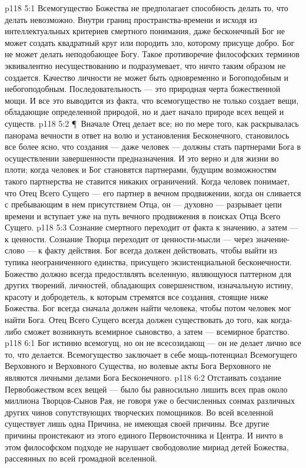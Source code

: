 \vs p118 5:1 Всемогущество Божества не предполагает способность делать то, что делать невозможно. Внутри границ пространства\hyp{}времени и исходя из интеллектуальных критериев смертного понимания, даже бесконечный Бог не может создать квадратный круг или породить зло, которому присуще добро. Бог не может делать неподобающее Богу. Такое противоречие философских терминов эквивалентно несуществованию и подразумевает, что ничто таким образом не создается. Качество личности не может быть одновременно и Богоподобным и небогоподобным. Последовательность --- это природная черта божественной мощи. И все это выводится из факта, что всемогущество не только создает вещи, обладающие определенной природой, но и дает начало природе всех вещей и существ.
\vs p118 5:2 \P\ Вначале Отец делает все; но по мере того, как раскрывалась панорама вечности в ответ на волю и установления Бесконечного, становилось все более ясно, что создания --- даже человек --- должны стать партнерами Бога в осуществлении завершенности предназначения. И это верно и для жизни во плоти; когда человек и Бог становятся партнерами, будущим возможностям такого партнерства не ставится никаких ограничений. Когда человек понимает, что Отец Всего Сущего --- его партнер в вечном продвижении, когда он сливается с пребывающим в нем присутствием Отца, он --- духовно --- разрывает цепи времени и вступает уже на путь вечного продвижения в поисках Отца Всего Сущего.
\vs p118 5:3 Сознание смертного переходит от факта к значению, а затем --- к ценности. Сознание Творца переходит от ценности\hyp{}мысли --- через значение\hyp{}слово --- к факту действия. Бог всегда должен действовать, чтобы выйти из тупика неограниченного единства, присущего экзистенциальной бесконечности. Божество должно всегда предостлвлять вселенную, являющуюся паттерном для других творений, личностей, обладающих совершенством, изначальную истину, красоту и добродетель, к которым стремятся все создания, стоящие ниже Божества. Бог всегда сначала должен найти человека, чтобы потом человек мог найти Бога. Отец Всего Сущего всегда должен существовать до того, как когда\hyp{}либо сможет возникнуть всемирное сыновство, а затем --- всемирное братство.
\vs p118 6:1 Бог истинно всемогущ, но он не всесозидающ --- он не делает лично все то, что делается. Всемогущество заключает в себе мощь\hyp{}потенциал Всемогущего Верховного и Верховного Существа, но волевые акты Бога Верховного не являются личными делами Бога Бесконечного.
\vs p118 6:2 Отстаивать создание Первобожеством всех вещей --- было бы равносильно лишить всех прав около миллиона Творцов\hyp{}Сынов Рая, не говоря уже о бесчисленных сонмах различных других чинов сопутствующих творческих помощников. Во всей вселенной существует лишь одна Причина, не имеющая своей причины. Все другие причины проистекают из этого единого Первоисточника и Центра. И ничто в этом философском подходе не нарушает свободоволие мириад детей Божества, рассеянных по всей громадной вселенной.

